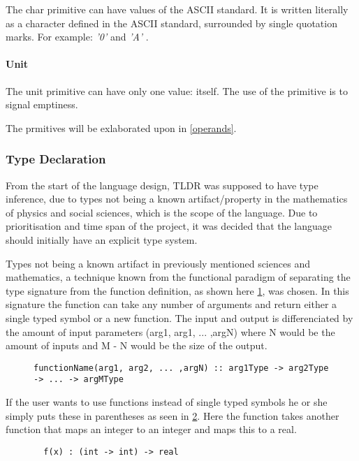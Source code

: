 The char primitive can have values of the ASCII standard. It is written literally as a character defined in the ASCII standard, surrounded by single quotation marks. For example: \emph{ '0' } and \emph{ 'A' }.

\paragraph{Unit}
\label{sec:unit}

The unit primitive can have only one value: itself. The use of the primitive is to signal emptiness.

The prmitives will be exlaborated upon in \cref{operands}.

\subsubsection{Type Declaration}
From the start of the language design, TLDR was supposed to have type inference, due to types not being a known artifact/property in the mathematics of physics and social sciences, which is the scope of the language. Due to prioritisation and time span of the project, it was decided that the language should initially have an explicit type system.

Types not being a known artifact in previously mentioned sciences and mathematics, a technique known from the functional paradigm of separating the type signature from the function definition, as shown here \cref{typesignature}, was chosen. In this signature the function can take any number of arguments and return either a single typed symbol or a new function. The input and output is differenciated by the amount of input parameters (arg1, arg1, ... ,argN) where N would be the amount of inputs and M - N would be the size of the output.

\begin{figure}
\begin{lstlisting}
functionName(arg1, arg2, ... ,argN) :: arg1Type -> arg2Type -> ... -> argMType
\end{lstlisting}
\caption{}
\label{typesignature}
\end{figure}

If the user wants to use functions instead of single typed symbols he or she simply puts these in parentheses as seen in \cref{typesignatureexample0}. Here the function takes another function that maps an integer to an integer and maps this to a real.

\begin{figure}
\begin{lstlisting}
  f(x) : (int -> int) -> real
\end{lstlisting}
\caption{}
\label{typesignatureexample0}
\end{figure}

